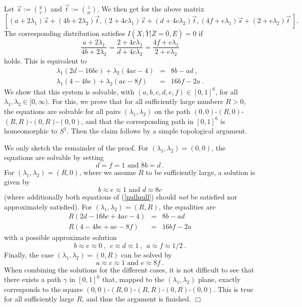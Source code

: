 \documentclass{article}
\newcommand{\peon}{\hspace*{\fill} $\Box$\\}
\newcommand{\CE}{{E}}
\newcommand{\OY}{\overline{Y}}
\newcommand{\OZ}{\overline{Z}}
\begin{document}
Let $\vec{s}:={y \choose v}$ and $\vec{t}:={z \choose w}$.
We then get for the above matrix 
\[
\left[
(a+2\lambda_1)\vec{s}+(4b+2\lambda_2)\vec{t}, 
(2+4c\lambda_1)\vec{s}+(d+4c\lambda_2)\vec{t},
(4f+e\lambda_1)\vec{s}+(2+e\lambda_2)\vec{t}\, 
\right].
\]
The corresponding distribution satisfies $I(X;\OY|\OZ=\overline{0},\CE)=0$
if 
\[
\frac{a+2\lambda_1}{4b+2\lambda_2}=\frac{2+4c\lambda_1}{d+4c\lambda_2}
=\frac{4f+e\lambda_1}{2+e\lambda_2}
\]
holds. This is equivalent  to 
\begin{eqnarray*}
\lambda_1(2d-16bc)+\lambda_2(4ac-4) & = & 8b-ad\ ,\\
\lambda_1(4-4be)+\lambda_2(ae-8f) & = & 16bf-2a\ .
\end{eqnarray*}
%
We show that this system is solvable, with $(a,b,c,d,e,f)\in[0,1]^6$, for all 
$\lambda_1,\lambda_2\in[0,\infty)$. For this, we prove that for all
sufficiently large numbers $R>0$, the equations are solvable 
for all pairs $(\lambda_1,\lambda_2)$
on the path $(0,0)$-$(R,0)$-$(R,R)$-$(0,R)$-$(0,0)$, 
and that the corresponding path in $[0,1]^6$ is homeomorphic to $S^1$.
Then the claim follows by a simple topological argument.

We only sketch the remainder of the proof.
For $(\lambda_1,\lambda_2)=(0,0)$, the equations are solvable by setting
\begin{equation}\label{nullnull}
d=f=1\mbox{\ \ and\ \ }8b=d\ .
\end{equation}
For $(\lambda_1,\lambda_2)=(R,0)$, where we assume $R$ to be sufficiently
 large, a solution is given by
\[
b\approx e\approx 1\mbox{\ \ and\ \ }d\approx 8c 
\] 
(where additionally both equations of (\ref{nullnull}) should {\em not\/} 
be satisfied nor approximately satisfied).
For $(\lambda_1,\lambda_2)=(R,R)$, the equalities are 
\begin{eqnarray*}
R(2d-16bc+4ac-4) & = & 8b-ad\\
R(4-4be+ae-8f) & = & 16bf-2a
\end{eqnarray*}
with a possible approximate solution
\[
b\approx e\approx 0\ ,\ \ c\approx d\approx 1\ ,\ \ a\approx f\approx 1/2\ .
\]
Finally, the case $(\lambda_1,\lambda_2)=(0,R)$ can be  solved by
\[
a\approx c\approx 1\mbox{\ \ and\ \ }e\approx 8f\ .
\]
When combining the solutions for the different cases, it is not difficult 
to see that there exists a path
$\gamma$ in $[0,1]^6$ that, mapped to the $(\lambda_1,\lambda_2)$ plane,
exactly corresponds to the square $(0,0)$-$(R,0)$-$(R,R)$-$(0,R)$-$(0,0)$.
This is true for all sufficiently large 
$R$, and thus the argument is finished.
\peon
\end{document}
